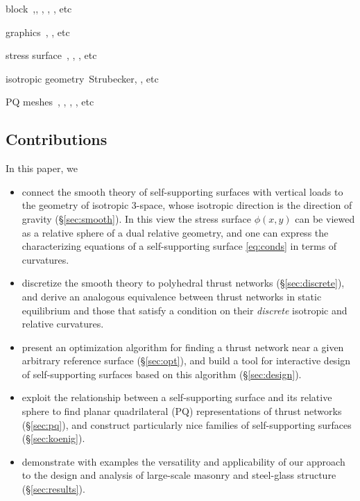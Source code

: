 \documentclass[annual]{acmsiggraph}
\newcommand{\secref}[1]{(\S\ref{#1})}
\begin{document}
block~\cite{Block06},\cite{Block07}, \cite{O'Dwyer98}, \cite{Heyman95}, \cite{Livesley92}, etc

graphics~\cite{Whiting09}, \cite{Kilian2005}, etc

stress surface~\cite{Fraternali2010}, \cite{Ash1988}, \cite{Giaquinta1985}, etc

isotropic geometry~Strubecker, \cite{Koenderink2002}, etc

PQ meshes~\cite{Schiftner2010}, \cite{Glymph2004}, \cite{Pottmann2007b}, \cite{Mirko2010}, etc

\subsection{Contributions}

In this paper, we

\begin{itemize}
\item connect the smooth theory of self-supporting surfaces with vertical loads to the geometry of isotropic 3-space, whose isotropic direction
is the direction of gravity \secref{sec:smooth}. In this view the stress surface $\phi(x,y)$ can
be viewed as a relative sphere of a dual relative geometry, and
one can express the characterizing equations of a 
self-supporting surface \eqref{eq:conds}
in terms of curvatures.
\item discretize the smooth theory to polyhedral thrust networks \secref{sec:discrete}, and derive an analogous equivalence between thrust networks in static equilibrium and those that satisfy a condition on their \emph{discrete} isotropic and relative curvatures.
\item present an optimization algorithm for finding a thrust network near a given arbitrary reference surface \secref{sec:opt}, and build a tool for interactive design of self-supporting surfaces based on this algorithm \secref{sec:design}.
\item exploit the relationship between a self-supporting surface and its relative sphere to find planar quadrilateral (PQ) representations of thrust networks \secref{sec:pq}, and construct particularly nice families of self-supporting surfaces \secref{sec:koenig}.
\item demonstrate with examples the versatility and applicability of our approach to the design and analysis of large-scale masonry and steel-glass structure \secref{sec:results}.
\end{itemize}
\end{document}
